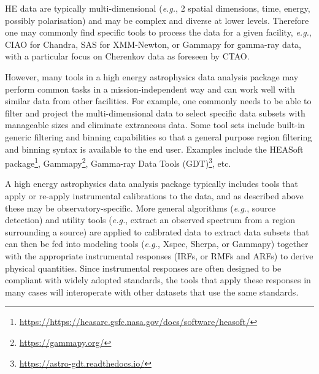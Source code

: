 \documentclass[11pt,a4paper]{ivoa}
\begin{document}
{%
%
%
%
%


\gls{HE} data are typically multi-dimensional ({\em e.g.\/}, 2 spatial dimensions, time, energy, possibly polarisation) and may be complex and diverse at lower levels.  Therefore one may commonly find specific tools to process the data for a given facility, {\em e.g.\/}, CIAO for Chandra, \gls{SAS} for \gls{XMM-Newton}, or Gammapy for gamma-ray data, with a particular focus on Cherenkov data as foreseen by \gls{CTAO}.

However, many tools in a high energy astrophysics data analysis package may perform common tasks in a mission-independent way and can work well with similar data from other facilities.  For example, one commonly needs to be able to filter and project the multi-dimensional data to select specific data subsets with manageable sizes and eliminate extraneous data.  Some tool sets include built-in generic filtering and binning capabilities so that a general purpose region filtering and binning syntax is available to the end user.  Examples include the HEASoft package\footnote{\url{https://https://heasarc.gsfc.nasa.gov/docs/software/heasoft/}}, Gammapy\footnote{\url{https://gammapy.org/}}, Gamma-ray Data Tools (GDT)\footnote{\url{https://astro-gdt.readthedocs.io/}}, etc.  

A high energy astrophysics data analysis package typically includes tools that apply or re-apply instrumental calibrations to the data, and as described above these may be observatory-specific.  More general algorithms ({\em e.g.\/}, source detection) and utility tools ({\em e.g.\/}, extract an observed spectrum from a region surrounding a source) are applied to calibrated data to extract data subsets that can then be fed into modeling tools ({\em e.g.\/}, Xspec, Sherpa, or Gammapy) together with the appropriate instrumental responses (\gls{IRF}s, or \gls{RMF}s and \gls{ARF}s) to derive physical quantities.  Since instrumental responses are often designed to be compliant with widely adopted standards, the tools that apply these responses in many cases will interoperate with other datasets that use the same standards.

}
\end{document}
